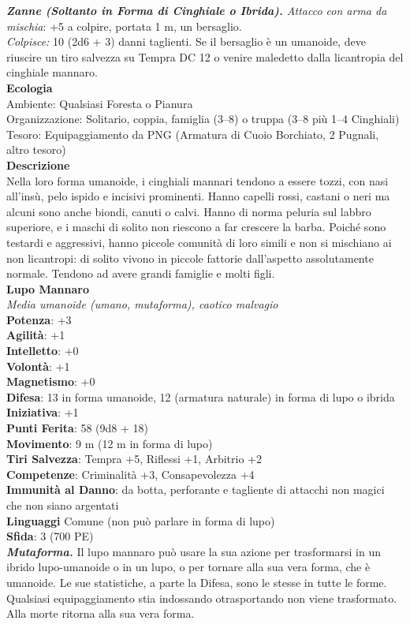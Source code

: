 \begin{multicols}{2}
\emph{\textbf{Zanne (Soltanto in Forma di Cinghiale o Ibrida).} Attacco con arma da mischia}: +5 a colpire, portata 1 m, un bersaglio.\\
\emph{Colpisce:} 10 (2d6 + 3) danni taglienti. Se il bersaglio è un umanoide, deve riuscire un tiro salvezza su Tempra DC 12 o venire maledetto dalla licantropia del cinghiale mannaro.\\
\textbf{Ecologia}\\
Ambiente: Qualsiasi Foresta o Pianura\\
Organizzazione: Solitario, coppia, famiglia (3–8) o truppa (3–8 più 1–4 Cinghiali)\\
Tesoro: Equipaggiamento da PNG (Armatura di Cuoio Borchiato, 2 Pugnali, altro tesoro)\\
\textbf{Descrizione}\\
Nella loro forma umanoide, i cinghiali mannari tendono a essere tozzi, con nasi all'insù, pelo ispido e incisivi prominenti. Hanno capelli rossi, castani o neri ma alcuni sono anche biondi, canuti o calvi. Hanno di norma peluria sul labbro superiore, e i maschi di solito non riescono a far crescere la barba. Poiché sono testardi e aggressivi, hanno piccole comunità di loro simili e non si mischiano ai non licantropi: di solito vivono in piccole fattorie dall’aspetto assolutamente normale. Tendono ad avere grandi famiglie e molti figli.\\

\medskip\textbf{Lupo Mannaro}\\
\emph{Media umanoide (umano, mutaforma), caotico malvagio}\\
\textbf{Potenza}: +3\\
\textbf{Agilità}: +1\\
\textbf{Intelletto}: +0\\
\textbf{Volontà}: +1\\
\textbf{Magnetismo}: +0\\
\textbf{Difesa}: 13 in forma umanoide, 12 (armatura naturale) in forma di lupo o ibrida \\ \textbf{Iniziativa}: +1\\
\textbf{Punti Ferita}: 58 (9d8 + 18)\\
\textbf{Movimento}: 9 m (12 m in forma di lupo)\\
\textbf{Tiri Salvezza}: Tempra +5, Riflessi +1, Arbitrio +2\\
\textbf{Competenze}: Criminalità +3, Consapevolezza +4\\
\textbf{Immunità al Danno}: da botta, perforante e tagliente di attacchi non magici che non siano argentati\\
\textbf{Linguaggi} Comune (non può parlare in forma di lupo)\\
\textbf{Sfida}: 3 (700 PE)\smallskip\\
\emph{\textbf{Mutaforma.}} Il lupo mannaro può usare la sua azione per trasformarsi in un ibrido lupo-umanoide o in un lupo, o per tornare alla sua vera forma, che è umanoide. Le sue statistiche, a parte la Difesa, sono le stesse in tutte le forme. Qualsiasi equipaggiamento stia indossando otrasportando non viene trasformato. Alla morte ritorna alla sua vera  forma.\\


\end{multicols}
